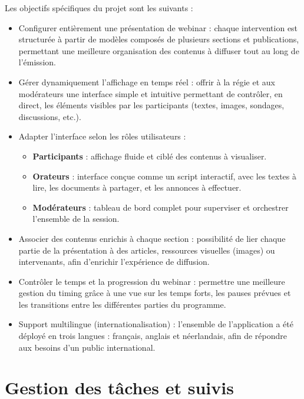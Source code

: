 Les objectifs spécifiques du projet sont les suivants :
\begin{itemize}
    \item Configurer entièrement une présentation de webinar : chaque intervention est structurée
    à partir de modèles composés de plusieurs sections et publications, permettant une meilleure
    organisation des contenus à diffuser tout au long de l'émission.
    \item Gérer dynamiquement l'affichage en temps réel : offrir à la régie et aux modérateurs
    une interface simple et intuitive permettant de contrôler, en direct, les éléments visibles
    par les participants (textes, images, sondages, discussions, etc.).
    \item Adapter l'interface selon les rôles utilisateurs :
        \begin{itemize}
            \item \textbf{Participants} : affichage fluide et ciblé des contenus à visualiser.
            \item \textbf{Orateurs} : interface conçue comme un script interactif, avec les textes
            à lire, les documents à partager, et les annonces à effectuer.
            \item \textbf{Modérateurs} : tableau de bord complet pour superviser et orchestrer
            l'ensemble de la session.
        \end{itemize}
    \item Associer des contenus enrichis à chaque section : possibilité de lier chaque partie
    de la présentation à des articles, ressources visuelles (images) ou intervenants, afin
    d'enrichir l'expérience de diffusion.
    \item Contrôler le temps et la progression du webinar : permettre une meilleure gestion du
    timing grâce à une vue sur les temps forts, les pauses prévues et les transitions entre
    les différentes parties du programme.
    \item Support multilingue (internationalisation) : l'ensemble de l'application a été déployé
    en trois langues : français, anglais et néerlandais, afin de répondre aux besoins d'un
    public international.
\end{itemize}

\section{Gestion des tâches et suivis}

